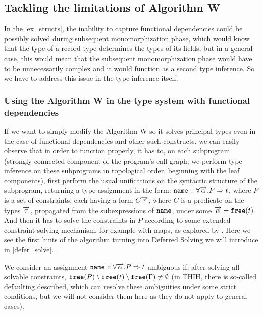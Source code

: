 \subsection{Tackling the limitations of Algorithm W}

In the \cref{ex_structs}, the inability to capture functional dependencies could be possibly solved during subsequent monomorphization phase, which would know that the type of a record type determines the types of its fields, but in a general case, this would mean that the subsequent monomorphization phase would have to be unnecessarily complex and it would function as a second type inference. So we have to address this issue in the type inference itself.

\subsubsection*{Using the Algorithm W in the type system with functional dependencies}

If we want to simply modify the Algorithm W so it solves principal types even in the case of functional dependencies and other such constructs, we can easily observe that in order to function properly, it has to, on each subprogram (strongly connected component of the program's call-graph; we perform type inference on these subprograms in topological order, beginning with the leaf components), first perform the usual unifications on the syntactic structure of the subprogram, returning a type assignment in the form: $\mathtt{name} :: \forall \overrightarrow{\alpha} . P  \Rightarrow t$, where $P$ is a set of constraints, each having a form $C \overrightarrow{\tau}$, where $C$ is a predicate on the types $\overrightarrow{\tau}$, propagated from the subexpressions of $\mathtt{name}$, under some $\overrightarrow{\alpha} = \mathtt{free} (t)$. And then it has to solve the constraints in $P$ according to some extended constraint solving mechanism, for example with maps, as explored by \cite{jones2000type}. Here we see the first hints of the algorithm turning into Deferred Solving we will introduce in \cref{defer_solve}.

\begin{defn}
    We consider an assignment $\mathtt{name} :: \forall \overrightarrow{\alpha} . P  \Rightarrow t$ ambiguous if, after solving all solvable constraints, $\mathtt{free} (P) \setminus \mathtt{free} (t) \setminus \mathtt{free} (\Gamma) \neq \emptyset$ (in THIH, there is so-called defaulting described, which can resolve these ambiguities under some strict conditions, but we will not consider them here as they do not apply to general cases).
\end{defn}

